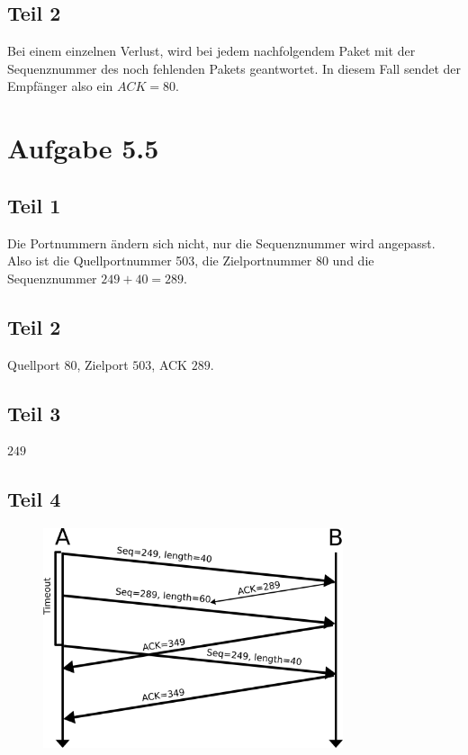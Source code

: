 \documentclass[10pt,a4paper]{article}
\begin{document}
\subsection{Teil 2}

Bei einem einzelnen Verlust, wird bei jedem nachfolgendem Paket mit der
Sequenznummer des noch fehlenden Pakets geantwortet. In diesem Fall sendet der
Empfänger also ein $ACK=80$.

\section{Aufgabe 5.5}

\subsection{Teil 1}

Die Portnummern ändern sich nicht, nur die Sequenznummer wird angepasst. Also
ist die Quellportnummer 503, die Zielportnummer 80 und die Sequenznummer
$249 + 40 = 289$.

\subsection{Teil 2}

Quellport $80$, Zielport $503$, ACK $289$.

\subsection{Teil 3}

$249$

\subsection{Teil 4}

\begin{figure}[H]
  \centering
  \includegraphics[width=250pt]{5_5_4}
\end{figure}
\end{document}
